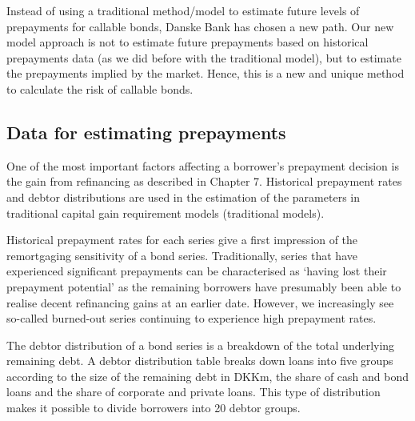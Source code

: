 \documentclass[12pt,twoside]{reedthesis}
\begin{document}
Instead of using a traditional method/model to estimate future levels of prepayments for callable bonds, Danske Bank has chosen a new path. Our new model approach is not to estimate future prepayments based on historical prepayments data (as we did before with the traditional model), but to estimate the prepayments implied by the market. Hence, this is a new and unique method to calculate the risk of callable bonds.

\hypertarget{data-for-estimating-prepayments}{%
\subsection{Data for estimating prepayments}\label{data-for-estimating-prepayments}}

One of the most important factors affecting a borrower's prepayment decision is the gain from refinancing as described in Chapter 7. Historical prepayment rates and debtor distributions are used in the estimation of the parameters in traditional capital gain requirement models (traditional models).

Historical prepayment rates for each series give a first impression of the remortgaging sensitivity of a bond series. Traditionally, series that have experienced significant prepayments can be characterised as `having lost their prepayment potential' as the remaining borrowers have presumably been able to realise decent refinancing gains at an earlier date. However, we increasingly see so-called burned-out series continuing to experience high prepayment rates.

The debtor distribution of a bond series is a breakdown of the total underlying remaining debt. A debtor distribution table breaks down loans into five groups according to the size of the remaining debt in DKKm, the share of cash and bond loans and the share of corporate and private loans. This type of distribution makes it possible to divide borrowers into 20 debtor groups.
\end{document}
